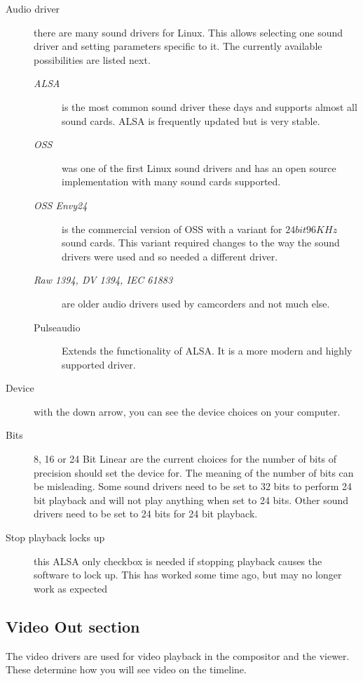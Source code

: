 \begin{description}
    \item[Audio driver] there are many sound drivers for Linux. This allows selecting one sound driver and setting parameters specific to it. The currently available possibilities are listed next.
    \begin{description}
        \item[\textit{ALSA}] is the most common sound driver these days and supports almost all sound cards. ALSA
        is frequently updated but is very stable.
        \item[\textit{OSS}] was one of the first Linux sound drivers and has an open source implementation with many sound cards supported.
        \item[\textit{OSS Envy24}] is the commercial version of OSS with a variant for $24 bit 96 KHz$ sound cards. This variant required changes to the way the sound drivers were used and so needed a different driver.
        \item[\textit{Raw 1394, DV 1394, IEC 61883}] are older audio drivers used by camcorders and not much else.
        \item[Pulseaudio] Extends the functionality of ALSA. It is a more modern and highly supported driver.
    \end{description}
    \item[Device] with the down arrow, you can see the device choices on your computer.
    \item[Bits] 8, 16 or 24 Bit Linear are the current choices for the number of bits of precision \CGG{} should set the device for. The meaning of the number of bits can be misleading. Some sound drivers need to be set to 32 bits to perform 24 bit playback and will not play anything when set to 24 bits. Other sound drivers need to be set to 24 bits for 24 bit playback.
    \item[Stop playback locks up] this ALSA only checkbox is needed if stopping playback causes the software to lock up.  This has worked some time ago, but may no longer work as expected
\end{description}

\subsection{Video Out section}%
\label{sub:video_out_section}

The video drivers are used for video playback in the compositor and the viewer.  These determine how you will see video on the timeline.

